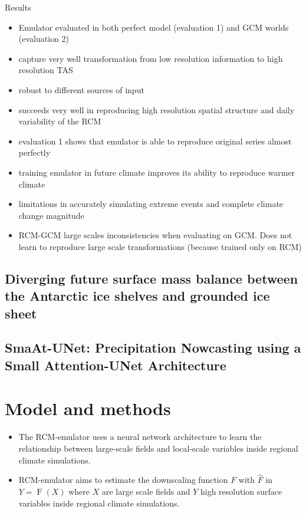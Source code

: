 \documentclass[a4paper,11pt,oneside]{report}
\begin{document}
Results
\begin{itemize}
    \item Emulator evaluated in both perfect model (evaluation 1) and GCM worlds (evaluation 2)
    \item capture very well transformation from low resolution information to high resolution TAS
    \item robust to different sources of input
    \item succeeds very well in reproducing high resolution spatial structure and daily variability of the RCM
    \item evaluation 1 shows that emulator is able to reproduce original series almost perfectly
    \item training emulator in future climate improves its ability to reproduce warmer climate
    \item limitations in accurately simulating extreme events and complete climate change magnitude
    \item RCM-GCM large scales inconsistencies when evaluating on GCM. Does not learn to reproduce large scale transformations (because trained only on RCM)
\end{itemize}
\section{Diverging future surface mass balance between the Antarctic ice shelves and grounded ice sheet \cite{Kittel}}

\section{SmaAt-UNet: Precipitation Nowcasting using a Small Attention-UNet Architecture~\cite{smatunet}}


\chapter{Model and methods}



\begin{itemize}
\item The RCM-emulator uses a neural network architecture to learn the relationship between large-scale fields and local-scale variables inside regional climate simulations.
\item RCM-emulator aims to estimate the downscaling function $F$ with $\hat{F}$ in $Y = \operatorname{F}(X)$ where $X$ are large scale fields and $Y$ high resolution surface variables inside regional climate simulations. 
\end{itemize}
\end{document}
